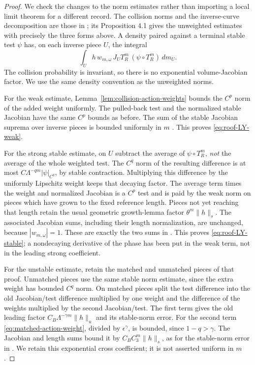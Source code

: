 \begin{proof}
We check the changes to the norm estimates rather than importing a
local limit theorem for a different record. The collision norms and
the inverse-curve decomposition are those in \cite[Section 3.3]{DZ};
its Proposition 4.1 gives the unweighted estimates with precisely the
three forms above. A density paired against a terminal stable test
$\psi$ has, on each inverse piece $U$, the integral
\begin{equation}\label{eq:weighted-curve-pairing}
 \int_U h\,w_{m,\omega}\,J_U T_R^m\,
                                  (\psi\circ T_R^m)\,dm_U.
\end{equation}
The collision probability is invariant, so there is no exponential
volume-Jacobian factor. We use the same density convention as the
unweighted norms.

For the weak estimate, Lemma~\ref{lem:collision-action-weights} bounds
the $C^p$ norm of the added weight uniformly. The pulled-back test and
the normalized stable Jacobian have the same $C^p$ bounds as before.
The sum of the stable Jacobian suprema over inverse pieces is bounded
uniformly in $m$ \cite[Lemma 3.2(b)]{DZ}. This proves
\eqref{eq:roof-LY-weak}.

For the strong stable estimate, on $U$ subtract the average of
$\psi\circ T_R^m$, \emph{not} the average of the whole weighted test.
The $C^q$ norm of the resulting difference is at most
$C\Lambda^{-qm}|\psi|_{C^q}$, by stable contraction. Multiplying this
difference by the uniformly Lipschitz weight keeps that decaying factor.
The average term times the weight and normalized Jacobian is a $C^p$
test and is paid by the weak norm on pieces which have grown to the
fixed reference length. Pieces not yet reaching that length retain the
usual geometric growth-lemma factor $\theta^m\|h\|_s$. The associated
Jacobian sums, including their length normalization, are unchanged,
because $|w_{m,\omega}|=1$. These are exactly the two sums in
\cite[equations (4.7)--(4.11)]{DZ}. This proves
\eqref{eq:roof-LY-stable}; a nondecaying derivative of the phase has
been put in the weak term, not in the leading strong coefficient.

For the unstable estimate, retain the matched and unmatched pieces of
that proof. Unmatched pieces use the same stable norm estimate, since
the extra weight has bounded $C^q$ norm. On matched pieces split the
test difference into the old Jacobian/test difference multiplied by one
weight and the difference of the weights multiplied by the second
Jacobian/test. The first term gives the old leading factor
$C_B\Lambda^{-\gamma m}\|h\|_u$ and its stable-norm error. For the
second term \eqref{eq:matched-action-weight}, divided by
$\epsilon^\gamma$, is bounded, since $1-q>\gamma$. The Jacobian and
length sums bound it by $C_B C_3^m\|h\|_s$, as for the stable-norm
error in \cite[equation (4.3)]{DZ}. We retain this exponential cross
coefficient; it is not asserted uniform in $m$.


\end{proof}

